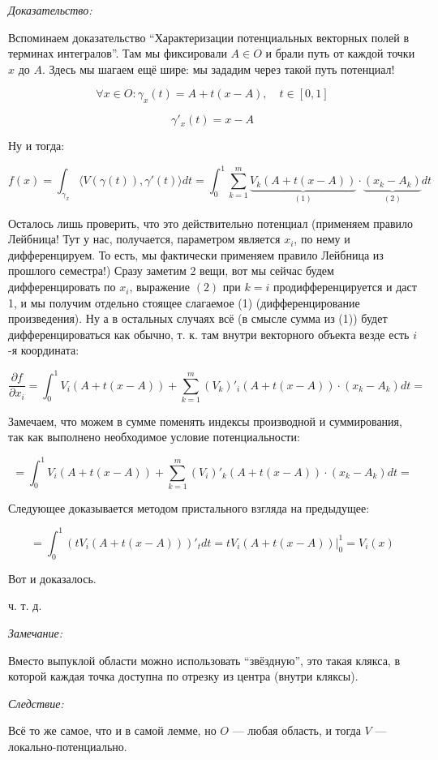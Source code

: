 \documentclass{article}
\def\sk#1#2{\langle #1, #2 \rangle}
\begin{document}
\textit{Доказательство: }

Вспоминаем доказательство ``Характеризации потенциальных векторных полей в терминах интегралов''. Там мы фиксировали $A \in O$ и брали путь от каждой точки $x$ до $A$. Здесь мы шагаем ещё шире: мы зададим через такой путь потенциал!

\[\forall x \in O : \gamma_x(t) = A + t(x - A), \quad t \in [0, 1]\]

\[\gamma'_x(t) = x - A\]

Ну и тогда:

\[f(x) = \int_{\gamma_x} \sk{V(\gamma(t))}{\gamma'(t)}dt = \int_0^1 \sum_{k = 1}^m \underbrace{V_k(A + t(x - A))}_{(1)}\cdot\underbrace{(x_k - A_k)}_{(2)} dt\]

Осталось лишь проверить, что это действительно потенциал (применяем правило Лейбница! Тут у нас, получается, параметром является $x_i$, по нему и дифференцируем. То есть, мы фактически применяем правило Лейбница из прошлого семестра!) Сразу заметим 2 вещи, вот мы сейчас будем дифференцировать по $x_i$, выражение $(2)$ при $k = i$ продифференцируется и даст 1, и мы получим отдельно стоящее слагаемое (1) (дифференцирование произведения). Ну а в остальных случаях всё (в смысле сумма из (1)) будет дифференцироваться как обычно, т. к. там внутри векторного объекта везде есть $i$-я координата:

\[\frac{\partial f}{\partial x_i} = \int_0^1 V_i(A + t(x - A)) + \sum_{k = 1}^m (V_k)'_i(A + t(x - A)) \cdot (x_k - A_k )dt = \]

Замечаем, что можем в сумме поменять индексы производной и суммирования, так как выполнено необходимое условие потенциальности:

\[ = \int_0^1 V_i(A + t(x - A)) + \sum_{k = 1}^m (V_i)'_k(A + t(x - A)) \cdot (x_k - A_k )dt =\]

Следующее доказывается методом пристального взгляда на предыдущее:

\[ = \int_0^1 \left(tV_i(A + t(x - A))\right)'_t dt = tV_i(A + t(x - A))|_0^1 = V_i(x)\]

Вот и доказалось.

ч. т. д. 

\textit{Замечание:}

Вместо выпуклой области можно использовать ``звёздную'', это такая клякса, в которой каждая точка доступна по отрезку из центра (внутри кляксы).

\textit{Следствие:}

Всё то же самое, что и в самой лемме, но $O$ --- любая область, и тогда $V$ --- локально-потенциально.
\end{document}
